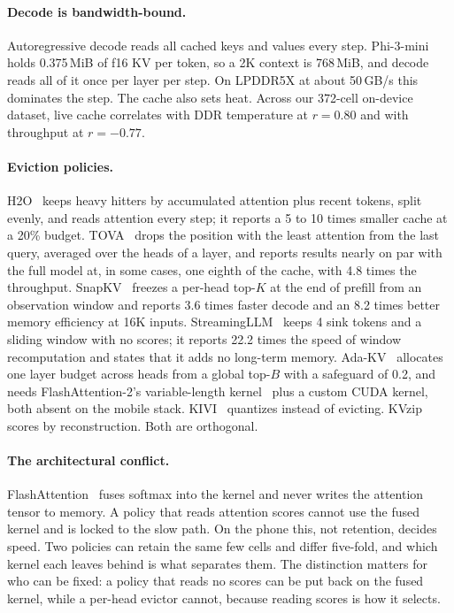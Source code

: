 \documentclass[sigconf, anonymous=false, screen=true]{acmart}
\begin{document}
\paragraph{Decode is bandwidth-bound.} Autoregressive decode reads all cached keys and values every step. Phi-3-mini holds 0.375\,MiB of f16 KV per token, so a 2K context is 768\,MiB, and decode reads all of it once per layer per step. On LPDDR5X at about 50\,GB/s this dominates the step. The cache also sets heat. Across our 372-cell on-device dataset, live cache correlates with DDR temperature at $r{=}0.80$ and with throughput at $r{=}{-}0.77$.

\paragraph{Eviction policies.} H2O~\cite{zhang2023h2o} keeps heavy hitters by accumulated attention plus recent tokens, split evenly, and reads attention every step; it reports a 5 to 10 times smaller cache at a 20\% budget. TOVA~\cite{oren2024tova} drops the position with the least attention from the last query, averaged over the heads of a layer, and reports results nearly on par with the full model at, in some cases, one eighth of the cache, with 4.8 times the throughput. SnapKV~\cite{li2024snapkv} freezes a per-head top-$K$ at the end of prefill from an observation window and reports 3.6 times faster decode and an 8.2 times better memory efficiency at 16K inputs. StreamingLLM~\cite{xiao2024streamingllm} keeps 4 sink tokens and a sliding window with no scores; it reports 22.2 times the speed of window recomputation and states that it adds no long-term memory. Ada-KV~\cite{feng2025adakv} allocates one layer budget across heads from a global top-$B$ with a safeguard of 0.2, and needs FlashAttention-2's variable-length kernel~\cite{dao2023flashattention2} plus a custom CUDA kernel, both absent on the mobile stack. KIVI~\cite{liu2024kivi} quantizes instead of evicting. KVzip~\cite{kim2025kvzip} scores by reconstruction. Both are orthogonal.

\paragraph{The architectural conflict.} FlashAttention~\cite{dao2022flashattention} fuses softmax into the kernel and never writes the attention tensor to memory. A policy that reads attention scores cannot use the fused kernel and is locked to the slow path. On the phone this, not retention, decides speed. Two policies can retain the same few cells and differ five-fold, and which kernel each leaves behind is what separates them. The distinction matters for who can be fixed: a policy that reads no scores can be put back on the fused kernel, while a per-head evictor cannot, because reading scores is how it selects.
\end{document}
